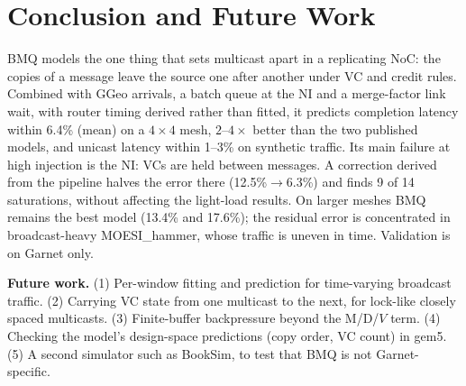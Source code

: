 \documentclass[conference]{IEEEtran}
\begin{document}
\section{Conclusion and Future Work}
BMQ models the one thing that sets multicast apart in a replicating NoC: the copies of a message leave the source one after another under VC and credit rules. Combined with GGeo arrivals, a batch queue at the NI and a merge-factor link wait, with router timing derived rather than fitted, it predicts completion latency within 6.4\% (mean) on a $4{\times}4$ mesh, $2$--$4\times$ better than the two published models, and unicast latency within 1--3\% on synthetic traffic. Its main failure at high injection is the NI: VCs are held between messages. A correction derived from the pipeline halves the error there (12.5\%$\to$6.3\%) and finds 9 of 14 saturations, without affecting the light-load results. On larger meshes BMQ remains the best model (13.4\% and 17.6\%); the residual error is concentrated in broadcast-heavy MOESI\_hammer, whose traffic is uneven in time. Validation is on Garnet only.

\textbf{Future work.} (1) Per-window fitting and prediction for time-varying broadcast traffic. (2) Carrying VC state from one multicast to the next, for lock-like closely spaced multicasts. (3) Finite-buffer backpressure beyond the M/D/$V$ term. (4) Checking the model's design-space predictions (copy order, VC count) in gem5. (5) A second simulator such as BookSim, to test that BMQ is not Garnet-specific.
\end{document}
